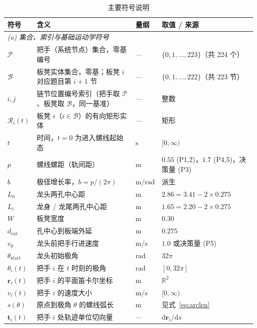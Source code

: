 \documentclass[a4paper, 12pt]{ctexart}
\begin{document}
\begin{table}[H]
  \centering
  \small
  \caption{主要符号说明}
  \label{tab:symbols}
  \begin{tabular}{llll}
    \toprule
    \textbf{符号} & \textbf{含义} & \textbf{量纲} & \textbf{取值 / 来源} \\
    \midrule
    \multicolumn{4}{l}{\textit{(a) 集合、索引与基础运动学符号}}\\
    $\mathcal{P}$ & 把手（系统节点）集合，零基编号 & --- & $\{0,1,\dots,223\}$（共 224 个）\\
    $\mathcal{B}$ & 板凳实体集合，零基；板凳 $i$ 对应题目第 $i{+}1$ 节 & --- & $\{0,1,\dots,222\}$（共 223 节）\\
    $i,j$ & 链节位置编号索引（把手取 $\mathcal{P}$、板凳取 $\mathcal{B}$，同一基准） & --- & 整数 \\
    $\mathcal{R}_i(t)$ & 板凳 $i$（$i\in\mathcal{B}$）的有向矩形实体 & --- & 矩形 \\
    $t$ & 时间，$t=0$ 为进入螺线起始态 & $\mathrm{s}$ & $[0,\infty)$ \\
    $p$ & 螺线螺距（轨间距） & $\mathrm{m}$ & $0.55$ (P1,2)，$1.7$ (P4,5)，决策量 (P3) \\
    $b$ & 极径增长率，$b=p/(2\pi)$ & $\mathrm{m/rad}$ & 派生 \\
    $L_0$ & 龙头两孔中心距 & $\mathrm{m}$ & $2.86=3.41-2\times0.275$ \\
    $L_i$ & 龙身 / 龙尾两孔中心距 & $\mathrm{m}$ & $1.65=2.20-2\times0.275$ \\
    $W$ & 板凳宽度 & $\mathrm{m}$ & $0.30$ \\
    $d_{\text{ext}}$ & 孔中心到板端外延 & $\mathrm{m}$ & $0.275$ \\
    $v_0$ & 龙头前把手行进速度 & $\mathrm{m/s}$ & $1.0$ 或决策量 (P5) \\
    $\theta_{\text{start}}$ & 龙头初始极角 & $\mathrm{rad}$ & $32\pi$ \\
    $\theta_i(t)$ & 把手 $i$ 在 $t$ 时刻的极角 & $\mathrm{rad}$ & $[0,32\pi]$ \\
    $\boldsymbol{r}_i(t)$ & 把手 $i$ 的平面笛卡尔坐标 & $\mathrm{m}$ & $\mathbb{R}^2$ \\
    $v_i(t)$ & 把手 $i$ 的速度大小 & $\mathrm{m/s}$ & $[0,\infty)$ \\
    $s(\theta)$ & 原点到极角 $\theta$ 的螺线弧长 & $\mathrm{m}$ & 见式~\eqref{eq:arclen} \\
    $\boldsymbol{t}_i(t)$ & 把手 $i$ 处轨迹单位切向量 & --- & $\mathrm{d}\boldsymbol{r}_i/\mathrm{d}s$ \\

\end{tabular}
\end{table}
\end{document}
